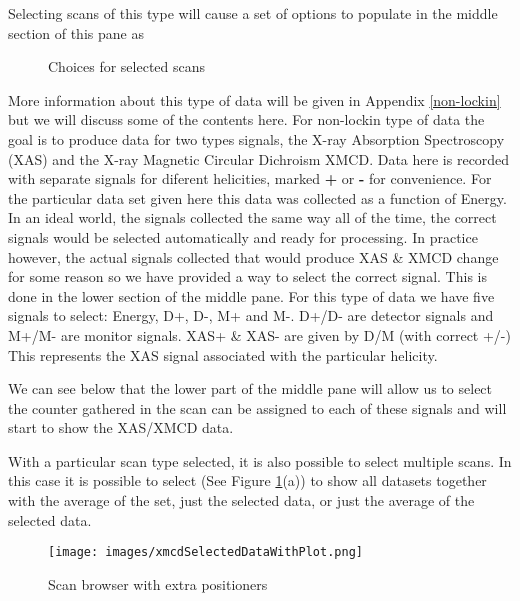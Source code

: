 \documentclass[12pt,letterpaper, openany]{book}
\begin{document}
Selecting scans of this type will cause a set of options to populate in the
middle section of this pane as 

\begin{figure}[htp]

\centering
{}


\caption {Choices for selected scans}
\label{fig:selectionChoice}
\end{figure}

More information about this type of data will be given in Appendix
\ref{non-lockin} but we will discuss some of the contents here. For non-lockin
type of data the goal is to produce data for two types signals, the X-ray
Absorption Spectroscopy (XAS) and the X-ray Magnetic Circular Dichroism XMCD. 
Data here is recorded with separate signals for diferent helicities, marked
\textbf{+} or \textbf{-} for convenience.  For the particular data set given
here this data was collected as a function of Energy.  In an ideal world, the
signals collected the same way all of the time, the correct signals would be
selected automatically and ready for processing.  In practice however, the
actual signals collected that would produce XAS \& XMCD change for some reason
so we have provided a way to select the correct signal.  This is done in the lower
section of the middle pane.  For this type of data we have five signals to
select: Energy, D+, D-, M+ and M-.  D+/D- are detector signals and M+/M- are
monitor signals.  XAS+ \& XAS- are given by D/M (with correct +/-)  This
represents the XAS signal associated with the particular helicity.  

We can see below that the lower part of the middle pane will allow us to select
the counter gathered in the scan can be assigned to each of these signals and
will start to show the XAS/XMCD data.

With a particular scan type selected, it is also possible to select multiple
scans.  In this case it is possible to select (See Figure
\ref{fig:selectionChoice}(a)) to show all datasets together with the average of
the set, just the selected data, or just the average of the selected data.
\begin{figure}
\texttt{[image: images/xmcdSelectedDataWithPlot.png]}
\caption {Scan browser with extra positioners}
\label{fig:selectedScanBrowser}
\end{figure}
\end{document}
